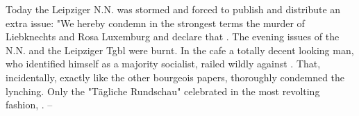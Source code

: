 
\missing

Today the Leipziger N.N. was stormed and forced to publish and distribute an extra issue: "We hereby condemn in the strongest terms the murder of Liebknechts and Rosa Luxemburg and declare that . The evening issues of the N.N. and the Leipziger Tgbl were burnt. In the cafe a totally decent looking man, who identified himself as a majority socialist, railed wildly against . That, incidentally, exactly like the other bourgeois papers, thoroughly condemned the lynching. Only the "Tägliche Rundschau" celebrated in the most revolting fashion, . --

\missing